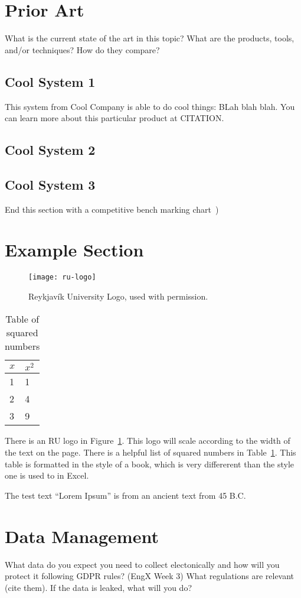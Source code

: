\section{Prior Art}
What is the current state of the art in this topic?
What are the products, tools, and/or techniques?
How do they compare?

\subsection{Cool System 1}
This system from Cool Company is able to do cool things:  BLah blah blah.
You can learn more about this particular product at CITATION.
\subsection{Cool System 2}
\subsection{Cool System 3}

End this section with a competitive bench marking chart~\cite[p.104]{ulrich2020product-design-development})

\section{Example Section}
\begin{figure}
  \centering
  \texttt{[image: ru-logo]}
  \caption[RU Logo]{Reykjavík University Logo, used with permission.}\label{fig:ru-logo}
\end{figure}
\begin{table}
  \centering
  \begin{tabular}{ll}\toprule
    $x$& $x^{2}$\\\midrule
    1 &1\\
    2 &4\\
    3 &9\\\bottomrule
  \end{tabular}
  \caption{Table of squared numbers}\label{tab:numbers}
\end{table}
There is an RU logo in Figure~\ref{fig:ru-logo}.
This logo will scale according to the width of the text on the page.
There is a helpful list of squared numbers in Table~\ref{tab:numbers}.
This table is formatted in the style of a book, which is very differerent than the style one is used to in Excel.

The test text ``Lorem Ipsum'' is from an ancient text from 45 B.C. \cite{cicero46deFinibus, lipsomwebsite}\\
\lipsum[1-5]


\section{Data Management}
What data do you expect you need to collect electonically and how will you protect it following GDPR rules?  (EngX Week 3)
What regulations are relevant (cite them).
If the data is leaked, what will you do?

